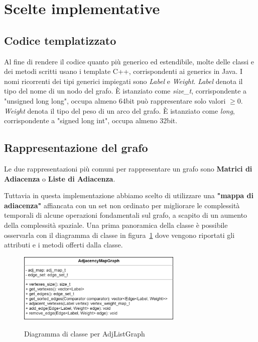 \section{Scelte implementative}
\label{cap:implementation-choices}

\subsection{Codice templatizzato}

Al fine di rendere il codice quanto più generico ed estendibile, molte delle classi e dei metodi scritti
usano i template C++, corrispondenti ai generics in Java.
I nomi ricorrenti dei tipi generici impiegati sono \textit{Label} e \textit{Weight}.
\textit{Label} denota il tipo del nome di un nodo del grafo. È istanziato come \textit{size\_t}, corrispondente a "unsigned long long", occupa almeno 64bit può rappresentare solo valori $\geq 0$.
\textit{Weight} denota il tipo del peso di un arco del grafo. È istanziato come \textit{long}, corrispondente a "signed long int",
occupa almeno 32bit.

\subsection{Rappresentazione del grafo}
\label{sub:graph-representation}

Le due rappresentazioni più comuni per rappresentare un grafo sono \textbf{Matrici di Adiacenza} o \textbf{Liste di Adiacenza}.

Tuttavia in questa implementazione abbiamo scelto di utilizzare una \textbf{"mappa di adiacenza"} affiancata con un set non ordinato per migliorare le complessità temporali di alcune operazioni fondamentali sul grafo, a scapito di un aumento della complessità spaziale. Una prima panoramica della classe è possibile osservarla con il diagramma di classe in figura~\ref{fig:AdjMapGraph Class} dove vengono riportati gli attributi e i metodi offerti dalla classe.

\begin{figure}[h]
	\caption{Diagramma di classe per AdjListGraph}
	\centering
	\includegraphics[width=0.7\textwidth]{./images/AdjancencyMapGrapClass.png}
	\label{fig:AdjMapGraph Class}
\end{figure}

